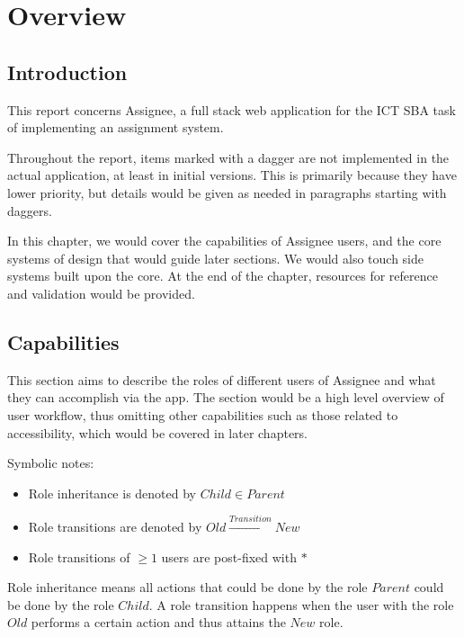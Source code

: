 \chapter{Overview}
\label{overview}

\section{Introduction}
\label{overview.intro}

This report concerns Assignee, a full stack web application for the ICT SBA task
of implementing an assignment system.

Throughout the report, items marked with a dagger \textdagger{} are not
implemented in the actual application, at least in initial versions. This is
primarily because they have lower priority, but details would be given as needed
in paragraphs starting with daggers.

In this chapter, we would cover the capabilities of Assignee users, and the core
systems of design that would guide later sections. We would also touch side
systems built upon the core. At the end of the chapter, resources for reference
and validation would be provided.

\section{Capabilities}
\label{overview.capab}

This section aims to describe the roles of different users of Assignee and what they
can accomplish via the app. The section would be a high level overview of user
workflow, thus omitting other capabilities such as those related to accessibility,
which would be covered in later chapters.

Symbolic notes:
\begin{itemize}
	\item Role inheritance is denoted by $Child\in{}Parent$

	\item Role transitions are denoted by $Old\xrightarrow{Transition}New$

	\item Role transitions of $\geq{}1$ users are post-fixed with $*$
\end{itemize}

Role inheritance means all actions that could be done by the role $Parent$ could
be done by the role $Child$. A role transition happens when the user with the role
$Old$ performs a certain action and thus attains the $New$ role.

